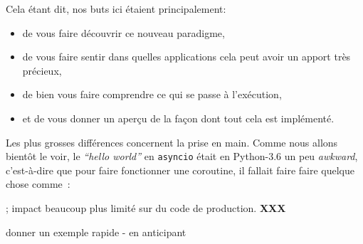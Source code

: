     Cela étant dit, nos buts ici étaient principalement:

\begin{itemize}
\tightlist
\item
  de vous faire découvrir ce nouveau paradigme,
\item
  de vous faire sentir dans quelles applications cela peut avoir un
  apport très précieux,
\item
  de bien vous faire comprendre ce qui se passe à l'exécution,
\item
  et de vous donner un aperçu de la façon dont tout cela est implémenté.
\end{itemize}

    Les plus grosses différences concernent la prise en main. Comme nous
allons bientôt le voir, le \emph{``hello world''} en \texttt{asyncio}
était en Python-3.6 un peu \emph{awkward}, c'est-à-dire que pour faire
fonctionner une coroutine, il fallait faire faire quelque chose comme~:

; impact beaucoup plus limité sur du code de production. \textbf{XXX}

donner un exemple rapide - en anticipant


    
    
    
